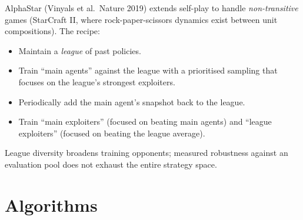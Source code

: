 \documentclass[11pt,oneside]{scrbook}
\begin{document}
AlphaStar (Vinyals et al.\ Nature 2019) extends self-play to handle
\emph{non-transitive} games (StarCraft II, where rock-paper-scissors
dynamics exist between unit compositions). The recipe:
\begin{itemize}\setlength\itemsep{1pt}
  \item Maintain a \emph{league} of past policies.
  \item Train ``main agents'' against the league with a prioritised
        sampling that focuses on the league's strongest exploiters.
  \item Periodically add the main agent's snapshot back to the league.
  \item Train ``main exploiters'' (focused on beating main agents) and
        ``league exploiters'' (focused on beating the league average).
\end{itemize}
League diversity broadens training opponents; measured robustness
against an evaluation pool does not exhaust the entire strategy space.

\chapter{Algorithms}

\begin{algorithm}[H]
\caption{MAPPO with centralised critic}\label{alg:mappo}
\DontPrintSemicolon
{}
\end{algorithm}

\begin{algorithm}[H]
\caption{Self-play in zero-sum games}\label{alg:sp}
\DontPrintSemicolon
{}
\end{algorithm}
\end{document}
